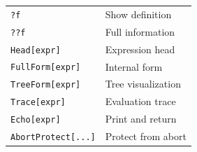 \documentclass[10pt]{extarticle}
\begin{document}
\begin{multicols}{2}
\begin{tabularx}{\linewidth}{@{}l@{\enspace}Y@{}}
\texttt{?f}                         & Show definition \\
\texttt{??f}                        & Full information \\
\texttt{Head[expr]}                 & Expression head \\
\texttt{FullForm[expr]}            & Internal form \\
\texttt{TreeForm[expr]}            & Tree visualization \\
\texttt{Trace[expr]}               & Evaluation trace \\
\texttt{Echo[expr]}                & Print and return \\
\texttt{AbortProtect[...]}         & Protect from abort \\
\end{tabularx}

\end{multicols}

\newpage

\end{document}
